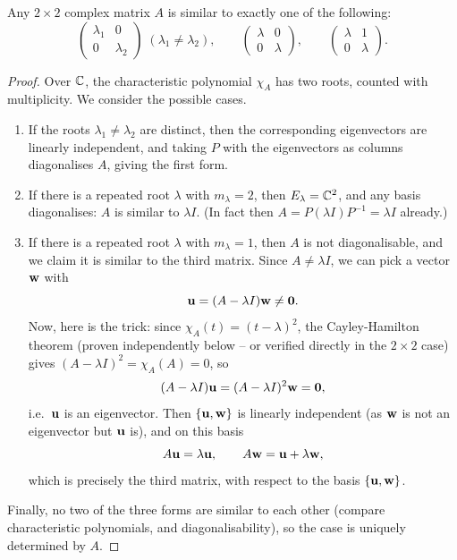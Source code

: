 \documentclass[a4paper]{scrartcl}
\begin{document}
\begin{theorem}
	Any $2 \times 2$ complex matrix $A$ is similar to exactly one of the following:
	$$
	\begin{pmatrix}
		\lambda_1 & 0 \\ 0 & \lambda_2
	\end{pmatrix} \; (\lambda_1 \neq \lambda_2), \quad\quad
	\begin{pmatrix}
		\lambda & 0 \\ 0 & \lambda
	\end{pmatrix}, \quad\quad
	\begin{pmatrix}
		\lambda & 1 \\ 0 & \lambda
	\end{pmatrix}.
	$$
\end{theorem}
\begin{proof}
	Over $\mathbb{C}$, the characteristic polynomial $\chi_A$ has two roots, counted with multiplicity. We consider the possible cases.
	\begin{enumerate}[label=(\roman*)]
		\item If the roots $\lambda_1 \neq \lambda_2$ are distinct, then the corresponding eigenvectors are linearly independent, and taking $P$ with the eigenvectors as columns diagonalises $A$, giving the first form.
		\item If there is a repeated root $\lambda$ with $m_\lambda = 2$, then $E_\lambda = \mathbb{C}^2$, and any basis diagonalises: $A$ is similar to $\lambda I$. (In fact then $A = P(\lambda I)P^{-1} = \lambda I$ already.)
		\item If there is a repeated root $\lambda$ with $m_\lambda = 1$, then $A$ is not diagonalisable, and we claim it is similar to the third matrix. Since $A \neq \lambda I$, we can pick a vector $\mathbf{w}$ with
		$$
		\mathbf{u} = (A - \lambda I)\mathbf{w} \neq \mathbf{0}.
		$$
		Now, here is the trick: since $\chi_A(t) = (t - \lambda)^2$, the Cayley-Hamilton theorem (proven independently below -- or verified directly in the $2\times 2$ case) gives $(A - \lambda I)^2 = \chi_A(A) = 0$, so
		$$
		(A - \lambda I)\mathbf{u} = (A - \lambda I)^2 \mathbf{w} = \mathbf{0},
		$$
		i.e.\ $\mathbf{u}$ is an eigenvector. Then $\{\mathbf{u}, \mathbf{w}\}$ is linearly independent (as $\mathbf{w}$ is not an eigenvector but $\mathbf{u}$ is), and on this basis
		$$
		A \mathbf{u} = \lambda \mathbf{u}, \quad \quad A \mathbf{w} = \mathbf{u} + \lambda \mathbf{w},
		$$
		which is precisely the third matrix, with respect to the basis $\{\mathbf{u}, \mathbf{w}\}$.
	\end{enumerate}
	Finally, no two of the three forms are similar to each other (compare characteristic polynomials, and diagonalisability), so the case is uniquely determined by $A$.
\end{proof}
\end{document}
